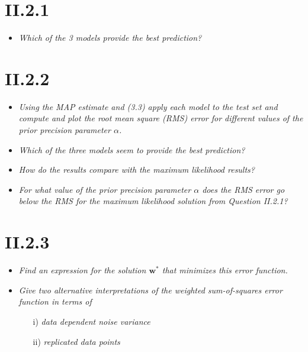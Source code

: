 \documentclass[12pt, a4paper]{article}
\begin{document}
\section{II.2.1}
\begin{itemize}
\item \textit{Which of the 3 models provide the best prediction?}
\end{itemize}

\section{II.2.2}
\begin{itemize}
\item \textit{Using the MAP estimate and (3.3) apply each model to the test
set and compute and plot the root mean square (RMS) error for different values
of the prior precision parameter $\alpha$.}
\item \textit{Which of the three models seem to provide
the best prediction?}
\item \textit{How do the results compare with the maximum likelihood
results?}
\item \textit{For what value of the prior precision parameter $\alpha$ does the RMS error go below the RMS for the maximum likelihood solution from Question II.2.1?}
\end{itemize}

\section{II.2.3}
\begin{itemize}
\item \textit{Find an expression for the solution $\textbf{w}^*$ that minimizes this error function.}
\item \textit{Give two alternative interpretations of the weighted sum-of-squares
error function in terms of}
\begin{itemize}
\item[i)] \textit{data dependent noise variance}
\item[ii)] \textit{replicated data points}
\end{itemize}
\end{itemize}
\end{document}
